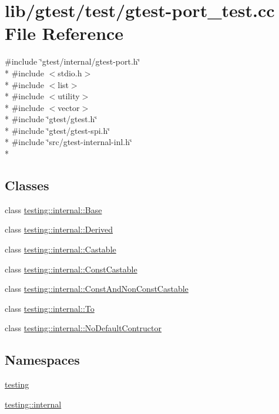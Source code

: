 \hypertarget{gtest-port__test_8cc}{\section{lib/gtest/test/gtest-\/port\-\_\-test.cc File Reference}
\label{gtest-port__test_8cc}
}
{\ttfamily \#include \char`\"{}gtest/internal/gtest-\/port.\-h\char`\"{}}\\*
{\ttfamily \#include $<$stdio.\-h$>$}\\*
{\ttfamily \#include $<$list$>$}\\*
{\ttfamily \#include $<$utility$>$}\\*
{\ttfamily \#include $<$vector$>$}\\*
{\ttfamily \#include \char`\"{}gtest/gtest.\-h\char`\"{}}\\*
{\ttfamily \#include \char`\"{}gtest/gtest-\/spi.\-h\char`\"{}}\\*
{\ttfamily \#include \char`\"{}src/gtest-\/internal-\/inl.\-h\char`\"{}}\\*
\subsection*{Classes}
\begin{DoxyCompactItemize}
\item 
class \hyperlink{classtesting_1_1internal_1_1_base}{testing\-::internal\-::\-Base}
\item 
class \hyperlink{classtesting_1_1internal_1_1_derived}{testing\-::internal\-::\-Derived}
\item 
class \hyperlink{classtesting_1_1internal_1_1_castable}{testing\-::internal\-::\-Castable}
\item 
class \hyperlink{classtesting_1_1internal_1_1_const_castable}{testing\-::internal\-::\-Const\-Castable}
\item 
class \hyperlink{classtesting_1_1internal_1_1_const_and_non_const_castable}{testing\-::internal\-::\-Const\-And\-Non\-Const\-Castable}
\item 
class \hyperlink{classtesting_1_1internal_1_1_to}{testing\-::internal\-::\-To}
\item 
class \hyperlink{classtesting_1_1internal_1_1_no_default_contructor}{testing\-::internal\-::\-No\-Default\-Contructor}
\end{DoxyCompactItemize}
\subsection*{Namespaces}
\begin{DoxyCompactItemize}
\item 
\hyperlink{namespacetesting}{testing}
\item 
\hyperlink{namespacetesting_1_1internal}{testing\-::internal}
\end{DoxyCompactItemize}
